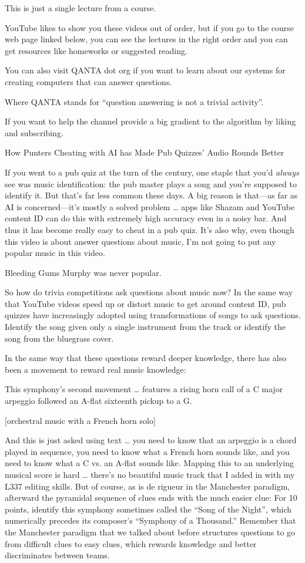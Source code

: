 This is just a single lecture from a course.

YouTube likes to show you these videos out of order, but if you go to the course web page linked below, you can see the lectures in the right order and you can get resources like homeworks or suggested reading.

You can also visit QANTA dot org
if you want to learn about our systems for creating computers that can answer questions.

Where QANTA stands for “question answering is not a trivial activity”.

If you want to help the channel provide a big gradient to the algorithm by liking and subscribing.


How Punters Cheating with AI has Made Pub Quizzes' Audio Rounds Better

If you went to a pub quiz at the turn of the century, one staple that you’d \emph{always} see was music identification: the pub master plays a song and you’re supposed to identify it.  But that’s far less common these days.  A big reason is that—as far as AI is concerned—it’s mostly a solved problem … apps like Shazam and YouTube content ID can do this with extremely high accuracy even in a noisy bar.  And thus it has become really easy to cheat in a pub quiz.  It’s also why, even though this video is about answer questions about music, I’m not going to put any popular music in this video.

Bleeding Gums Murphy was never popular.


So how do trivia competitions ask questions about music now?  In the same way that YouTube videos speed up or distort music to get around content ID, pub quizzes have increasingly adopted using transformations of songs to ask questions.  Identify the song given only a single instrument from the track or identify the song from the bluegrass cover.

In the same way that these questions reward deeper knowledge, there has also been a movement to reward real music knowledge:  

This symphony’s second movement … features a rising horn call of a C major arpeggio followed an A-flat sixteenth pickup to a G. 

[orchestral music with a French horn solo]


And this is just asked using text … you need to know that an arpeggio is a chord played in sequence, you need to know what a French horn sounds like, and you need to know what a C vs. an A-flat sounds like.  Mapping this to an underlying musical score is hard … there’s no beautiful music track that I added in with my L337 editing skills.  But of course, as is de rigueur in the Manchester paradigm, afterward the pyramidal sequence of clues ends with the much easier clue:
For 10 points, identify this symphony sometimes called the “Song of the Night”, which numerically precedes its composer’s “Symphony of a Thousand.”
Remember that the Manchester paradigm that we talked about before structures questions to go from difficult clues to easy clues, which rewards knowledge and better discriminates between teams.

